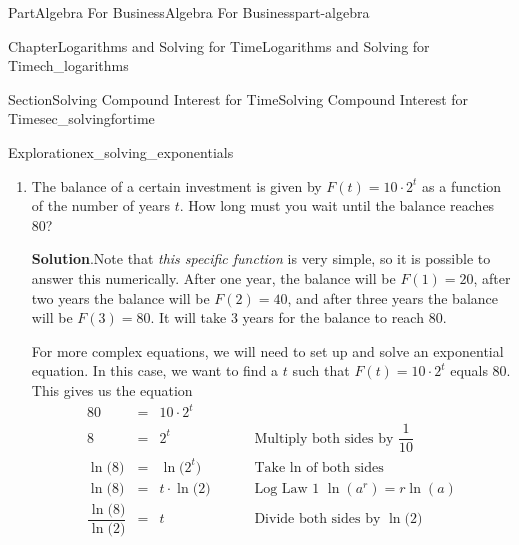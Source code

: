 \documentclass{tufte-book}
\newcommand{\blocktitlefont}{\relax}
\numberwithin{equation}{chapter}
\newcommand{\amp}{&}
\begin{document}
\begin{partptx}{Part}{Algebra For Business}{}{Algebra For Business}{}{}{part-algebra}
\begin{chapterptx}{Chapter}{Logarithms and Solving for Time}{}{Logarithms and Solving for Time}{}{}{ch_logarithms}
\begin{sectionptx}{Section}{Solving Compound Interest for Time}{}{Solving Compound Interest for Time}{}{}{sec_solvingfortime}
\begin{exploration}{Exploration}{}{ex_solving_exponentials}
\begin{enumerate}[font=\bfseries,label=(\alph*),ref=\alph*]
\begin{descriptionlist}
\begin{dlimedium}{Brute Force}{ex_solving_exponentials-2-2-1-1-2}
\begin{equation*}
\end{equation*}
Now we can use Law Log 1 \(\ln(a^r) = r\cdot \ln(a)\) with \(a=1.95\) and \(r=2x\) to get%
\begin{equation*}
\ln\Big( { 4}\Big) + 2x\cdot \ln\Big({ (1.95)} \Big) = \ln\Big(16\Big)
\end{equation*}
You can simplify this using a calculator to get%
\begin{equation*}
{1.386\dots} + 2\cdot x\cdot 0.667\dots = 2.772\dots
\end{equation*}
You can solve this as usual to get%
\begin{equation*}
x = \dfrac{{2.772\dots} - 1.386\dots}{2\cdot 0.667\dots} = 1.038\dots
\end{equation*}
Alternatively, you can solve the exact equation to get%
\begin{equation*}
x = \dfrac{\ln(16) - \ln(4)}{2\cdot \ln(1.95)}
\end{equation*}
%
\end{dlimedium}%
\end{descriptionlist}
%
\item{}The balance of a certain investment is given by \(F(t) = 10\cdot 2^t\) as a function of the number of years \(t\). How long must you wait until the balance reaches 80?%
\par\smallskip%
\noindent\textbf{\blocktitlefont Solution}.\hypertarget{ex_solving_exponentials-3-2}{}\quad{}Note that \emph{this specific function} is very simple, so it is possible to answer this numerically.  After one year, the balance will be \(F(1) = 20\), after two years the balance will be \(F(2)=40\), and after three years the balance will be \(F(3)=80\).   It will take 3 years for the balance to reach \(80\).%
\par
For more complex equations, we will need to set up and solve an exponential equation.  In this case, we want to find a \(t\) such that \(F(t) = 10 \cdot 2^t\) equals 80. This gives us the equation%
\begin{align*}
80 \amp=\amp 10 \cdot 2^t \amp \\
8 \amp=\amp 2^t \amp \qquad\text{ Multiply both sides by }\dfrac{1}{10}\\
\ln\Big(8\Big) \amp=\amp \ln\Big(2^t\Big) \amp  \qquad\text{ Take }\ln\text{ of both sides}\\
\ln\Big(8\Big) \amp=\amp t\cdot \ln\Big(2\Big) \amp \qquad\text{ Log Law 1 } \ln(a^r)=r\ln(a)\\
\dfrac{\ln\Big(8\Big)}{\ln\Big(2\Big)} \amp=\amp t  \amp \qquad\text{ Divide both sides by } \ln\Big(2\Big)

\end{align*}
\end{enumerate}
\end{exploration}
\end{sectionptx}
\end{chapterptx}
\end{partptx}
\end{document}
